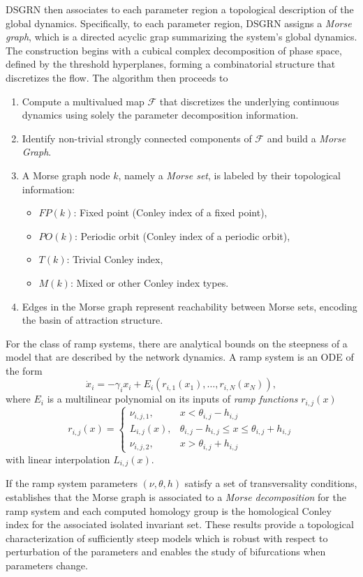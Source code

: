\documentclass[11pt]{article}
\newcommand{\Bernardo}[1]{{\color{red}\text{[Bernardo: #1]}}}
\begin{document}
DSGRN then associates to each parameter region a topological description of the global dynamics. Specifically, to each parameter region, DSGRN assigns a \textit{Morse graph}, which is a directed acyclic grap summarizing the system's global dynamics. The construction begins with a cubical complex decomposition of phase space, defined by the threshold hyperplanes, forming a combinatorial structure that discretizes the flow. The algorithm then proceeds to
\begin{enumerate}
  \item Compute a multivalued map $\mathcal{F}$ that discretizes the underlying continuous dynamics using solely the parameter decomposition information. 
  \item Identify non-trivial strongly connected components of $\mathcal{F}$ and build a \emph{Morse Graph}.
  \item A Morse graph node $k$, namely a \emph{Morse set}, is labeled by their topological information:
    \begin{itemize}
      \item $FP(k)$: Fixed point (Conley index of a fixed point),
      \item $PO(k)$: Periodic orbit (Conley index of a periodic orbit),
      \item $T(k)$: Trivial Conley index,
      \item $M(k)$: Mixed or other Conley index types.
    \end{itemize}
  \item Edges in the Morse graph represent reachability between Morse sets, encoding the basin of attraction structure.
\end{enumerate}
For the class of ramp systems, there are analytical bounds on the steepness of a model that are described by the network dynamics. A ramp system is an ODE of the form
\Bernardo{using the rook fields indexing}
$$\dot{x}_i = -\gamma_i x_i + E_i(r_{i,1}(x_1),\ldots,r_{i,N}(x_N)),$$
where $E_i$ is a multilinear polynomial on its inputs of \emph{ramp functions} $r_{i,j}(x)$
$$r_{i,j}(x) = \begin{cases}
\nu_{i,j,1}, & x < \theta_{i,j} - h_{i,j} \\
L_{i,j}(x), & \theta_{i,j} - h_{i,j} \leq x \leq \theta_{i,j} + h_{i,j} \\
\nu_{i,j,2}, & x > \theta_{i,j} + h_{i,j}
\end{cases}$$
with linear interpolation $L_{i,j}(x)$. 

If the ramp system parameters $(\nu,\theta,h)$ satisfy a set of transversality conditions, \cite{rookfields} establishes that the Morse graph is associated to a \emph{Morse decomposition} for the ramp system and each computed homology group is the homological Conley index for the associated isolated invariant set. These results provide a topological characterization of sufficiently steep models which is robust with respect to perturbation of the parameters and enables the study of bifurcations when parameters change. 
\newpage
\end{document}
